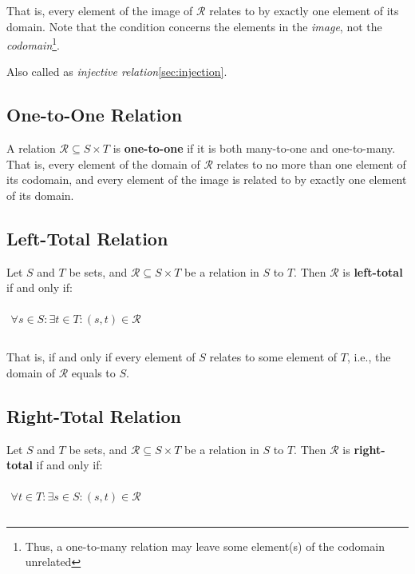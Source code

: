 That is, every element of the image of $\mathcal{R}$ relates to by
exactly one element of its domain. Note that the condition concerns
the elements in the \textit{image}, not the
\textit{codomain}\footnote{Thus, a one-to-many relation may leave some
  element(s) of the codomain unrelated}.

Also called as \textit{injective relation}\ref{sec:injection}.

\subsection{One-to-One Relation}
\label{sec:one-to-one}

A relation $\mathcal{R} \subseteq S \times T$ is \textbf{one-to-one}
if it is both many-to-one and one-to-many. That is, every element of
the domain of $\mathcal{R}$ relates to no more than one element of its
codomain, and every element of the image is related to by exactly one
element of its domain.


\subsection{Left-Total Relation}
\label{sec:left-total}

Let $S$ and $T$ be sets, and $\mathcal{R} \subseteq S \times T$ be a
relation in $S$ to $T$. Then $\mathcal{R}$ is \textbf{left-total} if
and only if:

\begin{math}
  \begin{array}{c}
    \\
    \forall s \in S: \exists t \in T: (s, t) \in \mathcal{R} \\
    \\
  \end{array}
\end{math}

That is, if and only if every element of $S$ relates to some element
of $T$, i.e., the domain of $\mathcal{R}$ equals to $S$.


\subsection{Right-Total Relation}
\label{sec:right-total}

Let $S$ and $T$ be sets, and $\mathcal{R} \subseteq S \times T$ be a
relation in $S$ to $T$. Then $\mathcal{R}$ is \textbf{right-total} if
and only if:

\begin{math}
  \begin{array}{c}
    \\
    \forall t \in T: \exists s \in S: (s, t) \in \mathcal{R} \\
    \\
  \end{array}
\end{math}

